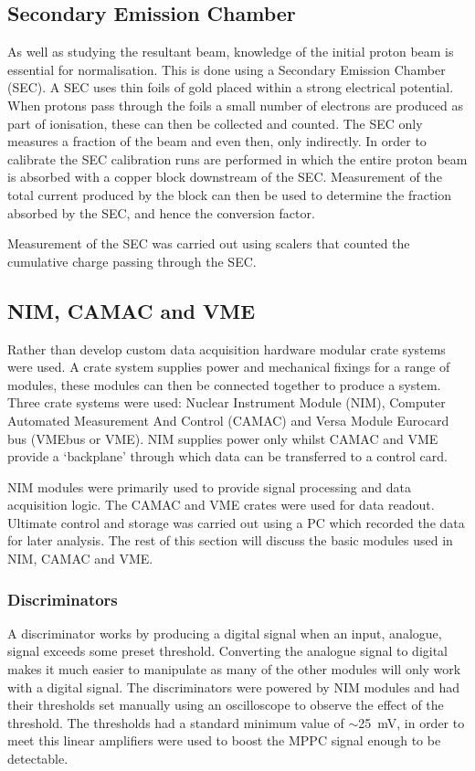 \subsection{Secondary Emission Chamber} %
\label{sub:secondary_emission_chamber}
As well as studying the resultant beam, knowledge of the initial proton beam is essential for normalisation. This is done using a Secondary Emission Chamber (SEC). A SEC uses thin foils of gold placed within a strong electrical potential. When protons pass through the foils a small number of electrons are produced as part of ionisation, these can then be collected and counted. The SEC only measures a fraction of the beam and even then, only indirectly. In order to calibrate the SEC calibration runs are performed in which the entire proton beam is absorbed with a copper block downstream of the SEC. Measurement of the total current produced by the block can then be used to determine the fraction absorbed by the SEC, and hence the conversion factor. 

Measurement of the SEC was carried out using scalers that counted the cumulative charge passing through the SEC.


\subsection{NIM, CAMAC and VME} %
\label{sub:nim_and_camac}
Rather than develop custom data acquisition hardware modular crate systems were used. A crate system supplies power and mechanical fixings for a range of modules, these modules can then be connected together to produce a system. Three crate systems were used: Nuclear Instrument Module (NIM), Computer Automated Measurement And Control (CAMAC) and Versa Module Eurocard bus (VMEbus or VME). NIM supplies power only whilst CAMAC and VME provide a `backplane' through which data can be transferred to a control card.

NIM modules were primarily used to provide signal processing and data acquisition logic. The CAMAC and VME crates were used for data readout. Ultimate control and storage was carried out using a PC which recorded the data for later analysis. The rest of this section will discuss the basic modules used in NIM, CAMAC and VME.
\subsubsection{Discriminators} %
\label{ssub:discriminators}
A discriminator works by producing a digital signal when an input, analogue, signal exceeds some preset threshold. Converting the analogue signal to digital makes it much easier to manipulate as many of the other modules will only work with a digital signal. The discriminators were powered by NIM modules and had their thresholds set manually using an oscilloscope to observe the effect of the threshold. The thresholds had a standard minimum value of \(\sim\)25~mV, in order to meet this linear amplifiers were used to boost the MPPC signal enough to be detectable. 

